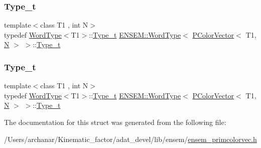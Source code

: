 \subsubsection{\texorpdfstring{Type\_t}{Type\_t}\hspace{0.1cm}{\footnotesize\ttfamily [1/2]}}
{\footnotesize\ttfamily template$<$class T1 , int N$>$ \\
typedef \mbox{\hyperlink{structENSEM_1_1WordType}{Word\+Type}}$<$T1$>$\+::\mbox{\hyperlink{structENSEM_1_1WordType_3_01PColorVector_3_01T1_00_01N_01_4_01_4_a86e73ce3277cd28d9e0550e1989ad245}{Type\+\_\+t}} \mbox{\hyperlink{structENSEM_1_1WordType}{E\+N\+S\+E\+M\+::\+Word\+Type}}$<$ \mbox{\hyperlink{classENSEM_1_1PColorVector}{P\+Color\+Vector}}$<$ T1, \mbox{\hyperlink{operator__name__util_8cc_a7722c8ecbb62d99aee7ce68b1752f337}{N}} $>$ $>$\+::\mbox{\hyperlink{structENSEM_1_1WordType_3_01PColorVector_3_01T1_00_01N_01_4_01_4_a86e73ce3277cd28d9e0550e1989ad245}{Type\+\_\+t}}}

\mbox{\label{structENSEM_1_1WordType_3_01PColorVector_3_01T1_00_01N_01_4_01_4_a86e73ce3277cd28d9e0550e1989ad245}} 
\subsubsection{\texorpdfstring{Type\_t}{Type\_t}\hspace{0.1cm}{\footnotesize\ttfamily [2/2]}}
{\footnotesize\ttfamily template$<$class T1 , int N$>$ \\
typedef \mbox{\hyperlink{structENSEM_1_1WordType}{Word\+Type}}$<$T1$>$\+::\mbox{\hyperlink{structENSEM_1_1WordType_3_01PColorVector_3_01T1_00_01N_01_4_01_4_a86e73ce3277cd28d9e0550e1989ad245}{Type\+\_\+t}} \mbox{\hyperlink{structENSEM_1_1WordType}{E\+N\+S\+E\+M\+::\+Word\+Type}}$<$ \mbox{\hyperlink{classENSEM_1_1PColorVector}{P\+Color\+Vector}}$<$ T1, \mbox{\hyperlink{operator__name__util_8cc_a7722c8ecbb62d99aee7ce68b1752f337}{N}} $>$ $>$\+::\mbox{\hyperlink{structENSEM_1_1WordType_3_01PColorVector_3_01T1_00_01N_01_4_01_4_a86e73ce3277cd28d9e0550e1989ad245}{Type\+\_\+t}}}



The documentation for this struct was generated from the following file\+:\begin{DoxyCompactItemize}
\item 
/\+Users/archanar/\+Kinematic\+\_\+factor/adat\+\_\+devel/lib/ensem/\mbox{\hyperlink{lib_2ensem_2ensem__primcolorvec_8h}{ensem\+\_\+primcolorvec.\+h}}\end{DoxyCompactItemize}
